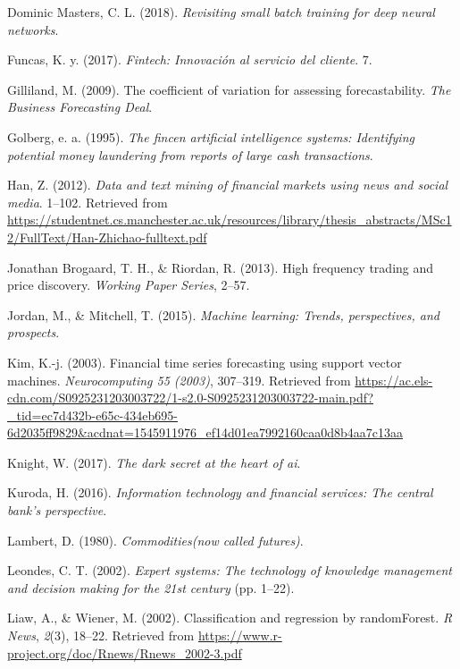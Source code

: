 \documentclass[]{DissertateUSU}
\begin{document}
\leavevmode\hypertarget{ref-smallbatch}{}%
Dominic Masters, C. L. (2018). \emph{Revisiting small batch training for
deep neural networks}.

\leavevmode\hypertarget{ref-KPMG}{}%
Funcas, K. y. (2017). \emph{Fintech: Innovación al servicio del
cliente}. 7.

\leavevmode\hypertarget{ref-CoVMike}{}%
Gilliland, M. (2009). The coefficient of variation for assessing
forecastability. \emph{The Business Forecasting Deal}.

\leavevmode\hypertarget{ref-FinCENblanqueo}{}%
Golberg, e. a. (1995). \emph{The fincen artificial intelligence systems:
Identifying potential money laundering from reports of large cash
transactions}.

\leavevmode\hypertarget{ref-zichao}{}%
Han, Z. (2012). \emph{Data and text mining of financial markets using
news and social media}. 1--102. Retrieved from
\url{https://studentnet.cs.manchester.ac.uk/resources/library/thesis_abstracts/MSc12/FullText/Han-Zhichao-fulltext.pdf}

\leavevmode\hypertarget{ref-HFTbank}{}%
Jonathan Brogaard, T. H., \& Riordan, R. (2013). High frequency trading
and price discovery. \emph{Working Paper Series}, 2--57.

\leavevmode\hypertarget{ref-machinelearning}{}%
Jordan, M., \& Mitchell, T. (2015). \emph{Machine learning: Trends,
perspectives, and prospects}.

\leavevmode\hypertarget{ref-kim2003}{}%
Kim, K.-j. (2003). Financial time series forecasting using support
vector machines. \emph{Neurocomputing 55 (2003)}, 307--319. Retrieved
from
\url{https://ac.els-cdn.com/S0925231203003722/1-s2.0-S0925231203003722-main.pdf?_tid=ec7d432b-e65c-434eb695-6d2035ff9829\&acdnat=1545911976_ef14d01ea7992160caa0d8b4aa7c13aa}

\leavevmode\hypertarget{ref-black}{}%
Knight, W. (2017). \emph{The dark secret at the heart of ai}.

\leavevmode\hypertarget{ref-privacy}{}%
Kuroda, H. (2016). \emph{Information technology and financial services:
The central bank's perspective}.

\leavevmode\hypertarget{ref-comodities}{}%
Lambert, D. (1980). \emph{Commodities(now called futures)}.

\leavevmode\hypertarget{ref-expertsystems}{}%
Leondes, C. T. (2002). \emph{Expert systems: The technology of knowledge
management and decision making for the 21st century} (pp. 1--22).

\leavevmode\hypertarget{ref-RF}{}%
Liaw, A., \& Wiener, M. (2002). Classification and regression by
randomForest. \emph{R News}, \emph{2}(3), 18--22. Retrieved from
\url{https://www.r-project.org/doc/Rnews/Rnews_2002-3.pdf}
\end{document}
